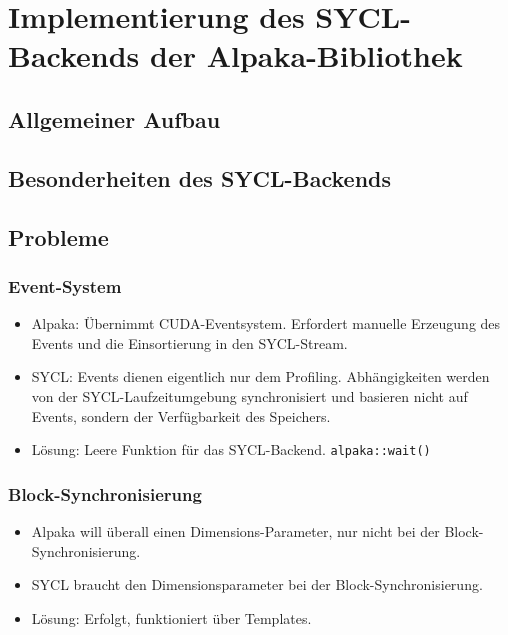 \chapter{Implementierung des SYCL-Backends der Alpaka-Bibliothek}\label{implementierung}

\section{Allgemeiner Aufbau}\label{implementierung:aufbau}

\section{Besonderheiten des SYCL-Backends}\label{implementierung:besonderheiten}

\section{Probleme}\label{implementierung:probleme}

\subsection{Event-System}

\begin{itemize}
    \item Alpaka: Übernimmt CUDA-Eventsystem. Erfordert manuelle Erzeugung des
          Events und die Einsortierung in den SYCL-Stream.
    \item SYCL: Events dienen eigentlich nur dem Profiling. Abhängigkeiten
          werden von der SYCL-Laufzeitumgebung synchronisiert und basieren nicht
          auf Events, sondern der Verfügbarkeit des Speichers.
    \item Lösung: Leere Funktion für das SYCL-Backend. \texttt{alpaka::wait()}
\end{itemize}

\subsection{Block-Synchronisierung}

\begin{itemize}
    \item Alpaka will überall einen Dimensions-Parameter, nur nicht bei der
          Block-Synchronisierung.
    \item SYCL braucht den Dimensionsparameter bei der Block-Synchronisierung.
    \item Lösung: Erfolgt, funktioniert über Templates.
\end{itemize}

